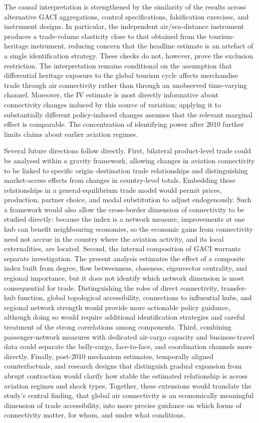 The causal interpretation is strengthened by the similarity of the results
across alternative GACI aggregations, control specifications, falsification
exercises, and instrument designs. In particular, the independent
air/sea-distance instrument produces a trade-volume elasticity close to that
obtained from the tourism-heritage instrument, reducing concern that the
headline estimate is an artefact of a single identification strategy. These
checks do not, however, prove the exclusion restriction. The interpretation
remains conditional on the assumption that differential heritage exposure to
the global tourism cycle affects merchandise trade through air connectivity
rather than through an unobserved time-varying channel. Moreover, the IV
estimate is most directly informative about connectivity changes induced by
this source of variation; applying it to substantially different
policy-induced changes assumes that the relevant marginal effect is
comparable. The concentration of identifying power after 2010 further limits
claims about earlier aviation regimes.

Several future directions follow directly. First, bilateral product-level
trade could be analysed within a gravity framework, allowing changes in
aviation connectivity to be linked to specific origin--destination trade
relationships and distinguishing market-access effects from changes in
country-level totals. Embedding these relationships in a general-equilibrium
trade model would permit prices, production, partner choice, and modal
substitution to adjust endogenously. Such a framework would also allow the
cross-border dimension of connectivity to be studied directly: because the
index is a network measure, improvements at one hub can benefit neighbouring
economies, so the economic gains from connectivity need not accrue in the
country where the aviation activity, and its local externalities, are
located. Second, the internal composition of
GACI warrants separate investigation. The present analysis estimates the
effect of a composite index built from degree, flow betweenness, closeness,
eigenvector centrality, and regional importance, but it does not identify
which network dimension is most consequential for trade. Distinguishing the
roles of direct connectivity, transfer-hub function, global topological
accessibility, connections to influential hubs, and regional network strength
would provide more actionable policy guidance, although doing so would
require additional identification strategies and careful treatment of the
strong correlations among components. Third, combining passenger-network
measures with dedicated air-cargo capacity and business-travel data could
separate the belly-cargo, face-to-face, and coordination channels more
directly. Finally, post-2010 mechanism estimates, temporally aligned
counterfactuals, and research designs that distinguish gradual expansion from
abrupt contraction would clarify how stable the estimated relationship is
across aviation regimes and shock types. Together, these extensions would
translate the study's central finding, that global air connectivity is an
economically meaningful dimension of trade accessibility, into more precise
guidance on which forms of connectivity matter, for whom, and under what
conditions.

